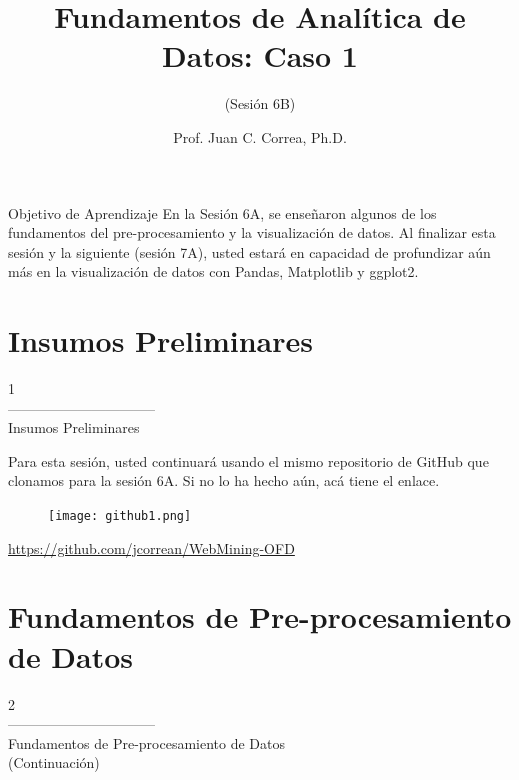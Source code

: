 \documentclass[aspectratio=169]{beamer}
\title[Fundamentos de Analítica de Datos: Caso 1]{Fundamentos de Analítica de Datos: Caso 1}
\subtitle{(Sesión 6B)}
\author[Prof. Juan C. Correa, Ph.D.]{Prof. Juan C. Correa, Ph.D.}
\institute[]{
Colegio de Estudios Superiores de Administración\\
Bogotá - Colombia\\
}
\date[Bogotá, Agosto, 2021] %
{}
\begin{document}
\begin{frame}
\titlepage
\end{frame}


\begin{frame}
\begin{block}{Objetivo de Aprendizaje}
En la Sesión 6A, se enseñaron algunos de los fundamentos del pre-procesamiento y la
visualización de datos. Al finalizar esta sesión y la siguiente (sesión 7A), usted estará en
capacidad de profundizar aún más en la visualización de datos con Pandas, Matplotlib y
ggplot2.
\end{block}
\end{frame}

\section{Insumos Preliminares}
\begin{frame}
\begin{center}
\Huge
\textcolor{azulcesaclaro}{1\\
--------------------------------\\
Insumos Preliminares}
\end{center}
\end{frame}

\begin{frame}
Para esta sesión, usted continuará usando el mismo repositorio de GitHub que clonamos para la sesión 6A. Si no lo ha hecho aún, acá tiene el enlace.
\begin{figure}
\centering
\texttt{[image: github1.png]}
\end{figure}
\centering
\textcolor{blue}{\url{https://github.com/jcorrean/WebMining-OFD}}
\end{frame}

\section{Fundamentos de Pre-procesamiento de Datos}
\begin{frame}
\begin{center}
\Huge
\textcolor{azulcesaclaro}{2\\
--------------------------------\\
Fundamentos de Pre-procesamiento de Datos\\
(Continuación)}
\end{center}
\end{frame}
\end{document}
